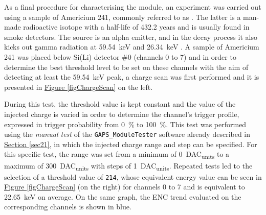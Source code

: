 \par
As a final procedure for characterising the module, an experiment was carried out using a sample of Americium 241, commonly referred to as .  The latter is a man-made radioactive isotope with a half-life of 432.2 years and is usually found in smoke detectors. The source is an alpha emitter, and in the decay process it also kicks out gamma radiation at \SI{59.54}{\kilo\electronvolt} and \SI{26.34}{\kilo\electronvolt} \cite{agencyfortoxicsubstancesanddiseaseregistry_2004_chemical}. A sample of Americium 241 was placed below Si(Li) detector \#0 (channels 0 to 7) and in order to determine the best threshold level to be set on these channels with the aim of detecting at least the \SI{59.54}{\kilo\electronvolt} peak, a charge scan was first performed and it is presented in \hyperref[figChargeScan]{Figure \ref{figChargeScan}} on the left. 

\par
During this test, the threshold value is kept constant and the value of the injected charge is varied in order to determine the channel's trigger profile, expressed in trigger probability from \SI{0}{\percent} to \SI{100}{\percent}. This test was performed using the \textit{manual test} of the \texttt{GAPS\_ModuleTester} software already described in \hyperref[sec21]{Section \ref{sec21}}, in which the injected charge range and step can be specified. For this specific test, the range was set from a minimum of \SI{0}{DAC_{units}} to a maximum of \SI{300}{DAC_{units}} with steps of \SI{1}{DAC_{units}}. Repeated tests led to the selection of a threshold value of \texttt{214}, whose equivalent energy value can be seen in \hyperref[figChargeScan]{Figure \ref{figChargeScan}} (on the right) for channels 0 to 7 and is equivalent to \SI{22.65}{\kilo\electronvolt} on average. On the same graph, the ENC trend evaluated on the corresponding channels is shown in blue. 

